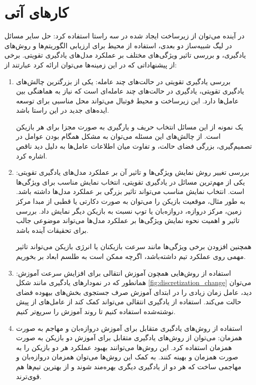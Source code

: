 \section{کار‌های آتی}
در آینده می‌توان از زیرساخت ایجاد شده در سه راستا استفاده کرد: حل سایر مسائل در لیگ شبیه‌ساز دو بعدی، استفاده از محیط برای ارزیابی الگوریتم‌ها و روش‌های یادگیری،
و بررسی تاثیر ویژگی‌های مختلف بر عملکرد مدل‌های یادگیری تقویتی.
برخی از پیشنهاداتی که در این زمینه‌ها می‌توان ارائه کرد عبارتند از:
\begin{enumerate}
    \item   بررسی یادگیری تقویتی در حالت‌های چند عامله: یکی از بزرگترین چالش‌های یادگیری تقویتی، یادگیری در حالت‌های چند عامله‌ای است که نیاز به هماهنگی بین عامل‌ها دارد. این زیرساخت و محیط فوتبال می‌تواند محل مناسبی برای توسعه ایده‌های جدید در این راستا باشد.

    یک نمونه از این مسائل انتخاب حریف و یارگیری به صورت مجزا برای هر بازیکن است. از چالش‌های این مسئله می‌توان به مشکل همگام بودن عوامل در تصمیم‌گیری، بزرگی فضای حالت، و تفاوت میان اطلاعات عامل‌ها به دلیل دید ناقص اشاره کرد.
    \item بررسی تغییر روش نمایش ویژگی‌ها و تاثیر آن بر عملکرد مدل‌های یادگیری تقویتی: یکی از مهم‌ترین مسائل در یادگیری تقویتی، انتخاب نمایش مناسب برای ویژگی‌ها است. انتخاب نمایش مناسب می‌تواند تاثیر بزرگی بر عملکرد مدل‌ها داشته باشد.
    به طور مثال، موقعیت بازیکن را می‌توان به صورت دکارتی یا قطبی از مبدا مرکز زمین، مرکز دروازه، دروازه‌بان یا توپ نسبت به بازیکن دیگر نمایش داد. بررسی تاثیر و اهمیت نحوه نمایش ویژگی‌ها بر عملکرد مدل‌ها می‌تواند موضوعی جالب برای تحقیقات آینده باشد.

    همچنین افزودن برخی ویژگی‌ها مانند سرعت بازیکنان یا انرژی بازیکن می‌تواند تاثیر مهمی روی عملکرد تیم داشته‌باشد، اگرچه ممکن است به طلسم ابعاد بر بخوریم.
    \item استفاده از روش‌هایی همچون آموزش انتقالی برای افزایش سرعت آموزش:
    همانطور که در نمودار‌های یادگیری مانند شکل \ref{fig:discretization_change}
    می‌توان دید، عامل زمان زیادی را در ابتدای آموزش صرف جستجوی بخش‌های بیهوده فضای حالت می‌کند. استفاده از یادگیری انتقالی می‌تواند کمک کند از عامل‌های از پیش نوشته‌شده استفاده کنیم تا روند آموزش را سریع‌تر کنیم.
    \item استفاده از روش‌های یادگیری متقابل برای آموزش دروازه‌بان و مهاجم به صورت همزمان:
    می‌توان از روش‌های یادگیری متقابل برای آموزش دو بازیکن به صورت همزمان استفاده کرد. این روش‌ها می‌توانند بهبود عملکرد هر دو بازیکن را به صورت همزمان و بهینه کنند.
    به کمک این روش‌ها می‌توان همزمان دروازه‌بان و مهاجمی ساخت که هر دو از یادگیری دیگری بهره‌مند شوند و از بهترین تیم‌ها هم قوی‌ترند.
\end{enumerate}
